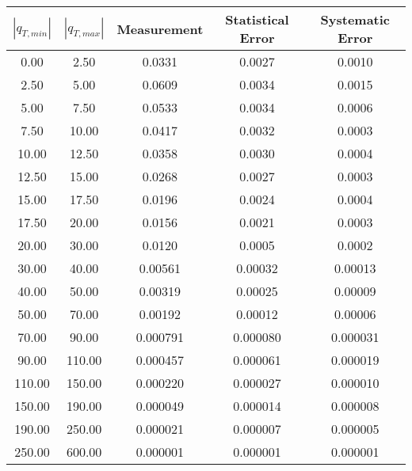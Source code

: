 \begin{tabular}{|c|c||c|c|c|}
\hline
$|q_{T,min}|$ & $|q_{T,max}|$ & Measurement & Statistical Error & Systematic Error \\ \hline
   0.00 &    2.50 &  0.0331 &  0.0027 &  0.0010 \\ 
   2.50 &    5.00 &  0.0609 &  0.0034 &  0.0015 \\ 
   5.00 &    7.50 &  0.0533 &  0.0034 &  0.0006 \\ 
   7.50 &   10.00 &  0.0417 &  0.0032 &  0.0003 \\ 
  10.00 &   12.50 &  0.0358 &  0.0030 &  0.0004 \\ 
  12.50 &   15.00 &  0.0268 &  0.0027 &  0.0003 \\ 
  15.00 &   17.50 &  0.0196 &  0.0024 &  0.0004 \\ 
  17.50 &   20.00 &  0.0156 &  0.0021 &  0.0003 \\ 
  20.00 &   30.00 &  0.0120 &  0.0005 &  0.0002 \\ 
  30.00 &   40.00 & 0.00561 & 0.00032 & 0.00013 \\ 
  40.00 &   50.00 & 0.00319 & 0.00025 & 0.00009 \\ 
  50.00 &   70.00 & 0.00192 & 0.00012 & 0.00006 \\ 
  70.00 &   90.00 & 0.000791 & 0.000080 & 0.000031 \\ 
  90.00 &  110.00 & 0.000457 & 0.000061 & 0.000019 \\ 
 110.00 &  150.00 & 0.000220 & 0.000027 & 0.000010 \\ 
 150.00 &  190.00 & 0.000049 & 0.000014 & 0.000008 \\ 
 190.00 &  250.00 & 0.000021 & 0.000007 & 0.000005 \\ 
 250.00 &  600.00 & 0.000001 & 0.000001 & 0.000001 \\ 
\hline
\end{tabular}